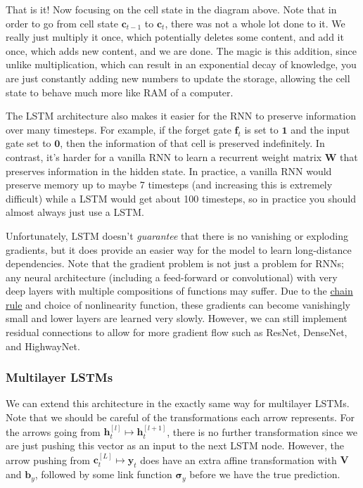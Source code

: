 \documentclass{article}
\begin{document}
  That is it! Now focusing on the cell state in the diagram above. Note that in order to go from cell state $\mathbf{c}_{t-1}$ to $\mathbf{c}_t$, there was not a whole lot done to it. We really just multiply it once, which potentially deletes some content, and add it once, which adds new content, and we are done. The magic is this addition, since unlike multiplication, which can result in an exponential decay of knowledge, you are just constantly adding new numbers to update the storage, allowing the cell state to behave much more like RAM of a computer. 

  The LSTM architecture also makes it easier for the RNN to preserve information over many timesteps. For example, if the forget gate $\mathbf{f}_t$ is set to $\mathbf{1}$ and the input gate set to $\mathbf{0}$, then the information of that cell is preserved indefinitely. In contrast, it's harder for a vanilla RNN to learn a recurrent weight matrix $\mathbf{W}$ that preserves information in the hidden state. In practice, a vanilla RNN would preserve memory up to maybe 7 timesteps (and increasing this is extremely difficult) while a LSTM would get about 100 timesteps, so in practice you should almost always just use a LSTM. 

  Unfortunately, LSTM doesn't \textit{guarantee} that there is no vanishing or exploding gradients, but it does provide an easier way for the model to learn long-distance dependencies. Note that the gradient problem is not just a problem for RNNs; any neural architecture (including a feed-forward or convolutional) with very deep layers with multiple compositions of functions may suffer. Due to the \hyperref[mv-thm:chain-rule]{chain rule} and choice of nonlinearity function, these gradients can become vanishingly small and lower layers are learned very slowly. However, we can still implement residual connections to allow for more gradient flow such as ResNet, DenseNet, and HighwayNet. 

  \subsubsection{Multilayer LSTMs}

    We can extend this architecture in the exactly same way for multilayer LSTMs. Note that we should be careful of the transformations each arrow represents. For the arrows going from $\mathbf{h}_{t}^{[l]} \mapsto \mathbf{h}_{t}^{[l+1]}$, there is no further transformation since we are just pushing this vector as an input to the next LSTM node. However, the arrow pushing from $\mathbf{c}_t^{[L]} \mapsto \hat{\mathbf{y}}_{t}$ does have an extra affine transformation with $\mathbf{V}$ and $\mathbf{b}_y$, followed by some link function $\boldsymbol{\sigma}_y$ before we have the true prediction.  
\end{document}
